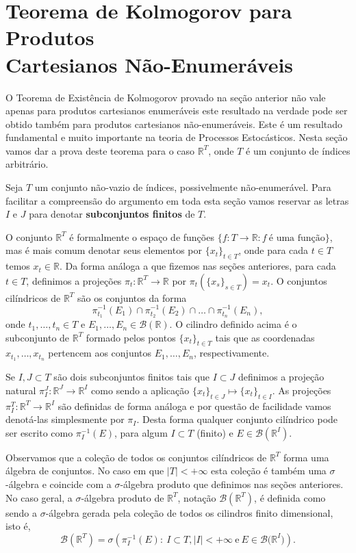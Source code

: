 \section[Teorema de Kolmogorov para Produtos Cartesianos Não-Enumeráveis]
{Teorema de Kolmogorov para Produtos \\Cartesianos Não-Enumeráveis}

O Teorema de Existência de Kolmogorov 
provado na seção anterior não vale apenas
para produtos cartesianos enumeráveis este resultado na verdade
pode ser obtido também para produtos
cartesianos não-enumeráveis. Este é um resultado fundamental e muito 
importante na teoria de Processos Estocásticos. Nesta seção 
vamos dar a prova deste teorema para o caso $\mathbb{R}^T$,
onde $T$ é um conjunto de índices arbitrário. 


Seja $T$ um conjunto não-vazio de índices, possivelmente não-enumerável.
Para facilitar a compreensão do argumento em toda esta seção vamos
reservar as letras $I$ e $J$ para denotar 
{\bf subconjuntos finitos}  de $T$.

O conjunto $\mathbb{R}^T$ é formalmente o espaço de funções 
$\{f:T\to\mathbb{R}: f\ \text{é uma função}\}$, 
mas é mais comum denotar seus elementos por $\{x_t\}_{t\in T}$,
onde para cada $t\in T$ temos $x_t\in\mathbb{R}$.
Da forma análoga a que fizemos nas seções anteriores,
para cada $t\in T$, 
definimos a projeções $\pi_t:\mathbb{R}^{T}\to\mathbb{R}$
por $\pi_t(\{x_s\}_{s\in T})=x_t$. O conjuntos cilíndricos 
de $\mathbb{R}^T$ são os conjuntos da forma 
\[
\pi^{-1}_{t_1}(E_1)
\cap 
\pi^{-1}_{t_2}(E_2)
\cap \ldots
\cap
\pi^{-1}_{t_n}(E_n),
\]
onde $t_1,\ldots, t_n\in T$ e $E_1,\ldots,E_n\in\mathscr{B}(\mathbb{R})$.
O cilindro definido acima é o subconjunto de $\mathbb{R}^T$ 
formado pelos pontos $\{x_t\}_{t\in T}$ tais que 
as coordenadas $x_{t_1},\ldots,x_{t_n}$ pertencem aos
conjuntos $E_1,\ldots,E_n$, respectivamente.


Se $I,J\subset T$ são dois subconjuntos finitos tais que 
$I\subset J$ definimos a projeção natural
$\pi^{J}_{I}:\mathbb{R}^J\to\mathbb{R}^I$ como 
sendo a aplicação $\{x_t\}_{t\in J}\mapsto \{x_t\}_{t\in I}$.  
As projeções $\pi^{T}_{I}:\mathbb{R}^T\to\mathbb{R}^I$
são definidas de forma análoga e por questão de facilidade
vamos denotá-las simplesmente por $\pi_I$.
Desta forma qualquer conjunto cilíndrico pode ser escrito 
como $\pi^{-1}_I(E)$, para algum $I\subset T$ (finito) e
$E\in \mathscr{B}(\mathbb{R}^{I})$.


Observamos que a coleção de todos os conjuntos cilíndricos
de $\mathbb{R}^T$ forma uma álgebra de conjuntos. No caso 
em que $|T|<+\infty$ esta coleção é também uma $\sigma$-álgebra
e coincide com a $\sigma$-álgebra produto que definimos nas 
seções anteriores. 
No caso geral, a $\sigma$-álgebra produto de $\mathbb{R}^T$,
notação $\mathscr{B}(\mathbb{R}^T)$,
é definida como sendo a $\sigma$-álgebra gerada pela 
coleção de todos os cilindros finito dimensional, isto é,
\[
\mathscr{B}(\mathbb{R}^T)
=
\sigma\left(
\pi^{-1}_{I}(E):
\ I\subset T, |I|<+\infty \ 
\text{e}\ 
E\in\mathscr{B}\big(\mathbb{R}^I\big)
\right).
\] 




